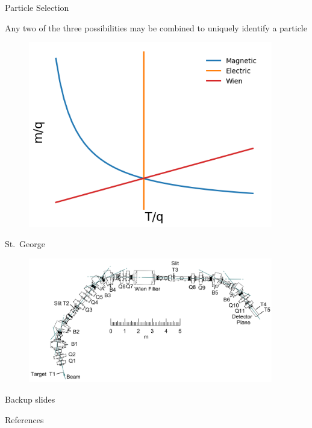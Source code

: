 \documentclass[10pt]{beamer}
\begin{document}
\begin{frame}{Particle Selection}

    Any two of the three possibilities may be combined to uniquely
    identify a particle

    \begin{figure}
        \includegraphics[width=0.95\textwidth]{figures/particle_selection_by_field.png}
    \end{figure}

\end{frame}

\begin{frame}{St.\ George}

    \begin{figure}
        \includegraphics[width=0.95\textwidth]{figures/stg.png}
    \end{figure}

\end{frame}

\appendix

\begin{frame}[fragile]{Backup slides}

\end{frame}

\begin{frame}[allowframebreaks]{References}

  
  

\end{frame}
\end{document}
